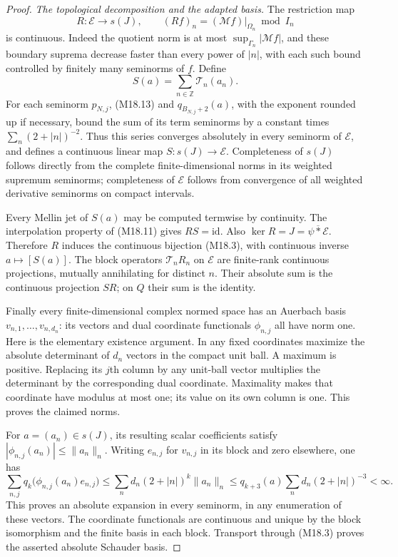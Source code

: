 \begin{proof}
\emph{The topological decomposition and the adapted basis.}
The restriction map
\[
 R:\mathcal E\longrightarrow s(J),\qquad
        (Rf)_n=(\mathcal Mf)|_{\Omega_n}\bmod I_n
\]
is continuous.  Indeed the quotient norm is at most
\(\sup_{\Gamma_n}|\mathcal Mf|\), and these boundary
suprema decrease faster than every power of \(|n|\),
with each such bound controlled by finitely many
seminorms of \(f\).  Define
\[
                    S(a)=\sum_{n\in\mathbb Z}\mathcal T_n(a_n).
\]
For each seminorm \(p_{N,j}\), (M18.13) and
\(q_{B_{N,j}+2}(a)\), with the exponent rounded up
if necessary, bound the sum of its term seminorms
by a constant times \(\sum_n(2+|n|)^{-2}\).
Thus this series converges absolutely in every
seminorm of \(\mathcal E\), and defines a continuous
linear map \(S:s(J)\to\mathcal E\).
Completeness of \(s(J)\) follows directly from the
complete finite-dimensional norms in its weighted
supremum seminorms; completeness of \(\mathcal E\)
follows from convergence of all weighted derivative
seminorms on compact intervals.

Every Mellin jet of \(S(a)\) may be computed
termwise by continuity.  The interpolation property
of (M18.11) gives \(RS=\mathrm{id}\).
Also \(\ker R=J=\overline{\psi*\mathcal E}\).
Therefore \(R\) induces the continuous bijection
(M18.3), with continuous inverse
\(a\mapsto[S(a)]\).
The block operators \(\mathcal T_n R_n\) on \(\mathcal E\)
are finite-rank continuous projections, mutually
annihilating for distinct \(n\).
Their absolute sum is the continuous projection
\(SR\); on \(Q\) their sum is the identity.

Finally every finite-dimensional complex normed
space has an Auerbach basis \(v_{n,1},\ldots,v_{n,d_n}\):
its vectors and dual coordinate functionals
\(\phi_{n,j}\) all have norm one.
Here is the elementary existence argument.  In
any fixed coordinates maximize the absolute
determinant of \(d_n\) vectors in the compact unit
ball.  A maximum is positive.  Replacing its
\(j\)th column by any unit-ball vector multiplies
the determinant by the corresponding dual
coordinate.  Maximality makes that coordinate
have modulus at most one; its value on its own
column is one.  This proves the claimed norms.

For \(a=(a_n)\in s(J)\), its resulting scalar
coefficients satisfy
\(|\phi_{n,j}(a_n)|\le\|a_n\|_n\).
Writing \(e_{n,j}\) for \(v_{n,j}\) in its block
and zero elsewhere, one has
\[
 \sum_{n,j}q_k\bigl(\phi_{n,j}(a_n)e_{n,j}\bigr)
 \le\sum_n d_n(2+|n|)^k\|a_n\|_n
 \le q_{k+3}(a)\sum_n d_n(2+|n|)^{-3}<\infty .
\]
This proves an absolute expansion in every
seminorm, in any enumeration of these vectors.
The coordinate functionals are continuous and
unique by the block isomorphism and the finite
basis in each block.  Transport through (M18.3)
proves the asserted absolute Schauder basis.
\end{proof}

